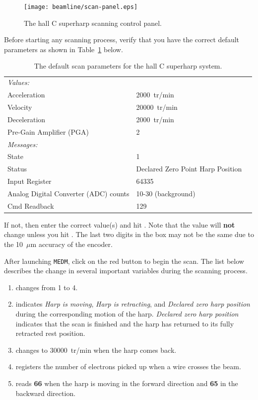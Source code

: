 \begin{figure}[!hbt]
\begin{center}
\texttt{[image: beamline/scan-panel.eps]}
\caption{The hall C superharp scanning control panel.}\label{figure:scan_harp}
\end{center}
\end{figure}

Before starting any scanning process, verify that you have the correct default parameters as shown in
Table~\ref{table:scan_harp} below.
\begin{table}[!hbt]
\begin{center}
\begin{tabular}{llr}
\hline
\hline
{\it Values:}			&	\\ 
Acceleration			& 2000~tr/min	\\
Velocity			& 20000~tr/min	\\
Deceleration			& 2000~tr/min	\\
Pre-Gain Amplifier (PGA)	& 2	\\
\hline
\hline
{\it Messages:} 		&	\\
State				& 1	\\
Status				& Declared Zero Point Harp Position \\
Input Register			& 64335 \\
Analog Digital Converter (ADC) counts& 10-30 (background) \\
Cmd Readback			& 129	\\
\hline
\hline
\end{tabular}
	\caption{The default scan parameters for the hall C superharp system.}
	\label{table:scan_harp}
\end{center}
\end{table}
If not, then enter the correct value(s) and hit {\bf{}}. Note that the value will {\bf not}
change  unless you hit . The last two digits in the
{\bf{}} box may
not be the same due to the 10~$\mu$m accuracy of the encoder.

After launching {\tt MEDM}, click on the red {\bf{}} button to begin the scan. The list
below describes the  change in several important variables during the scanning process.
\begin{enumerate}
\item {} changes from 1 to 4.
\item {} indicates {\it Harp is moving}, {\it Harp is retracting}, and
	{\it Declared zero harp position} during the corresponding motion of the harp.
	{\it Declared zero harp position} indicates that the scan is finished and the harp has
	returned to its fully retracted rest position.
\item {} changes to 30000~tr/min when the harp comes back.
\item {} registers the number of electrons picked up when a wire crosses the beam.
\item {} reads {\bf 66} when the harp is moving in the forward direction
	and {\bf 65} in the backward direction.
\end{enumerate}


